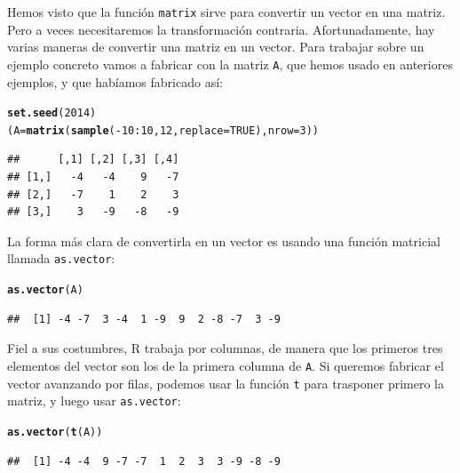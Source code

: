 \documentclass[10pt,a4paper]{article}\usepackage[]{graphicx}\usepackage[]{color}
\makeatletter
\newcommand{\hlnum}[1]{\textcolor[rgb]{0.686,0.059,0.569}{#1}}%
\newcommand{\hlopt}[1]{\textcolor[rgb]{0,0,0}{#1}}%
\newcommand{\hlstd}[1]{\textcolor[rgb]{0.345,0.345,0.345}{#1}}%
\newcommand{\hlkwb}[1]{\textcolor[rgb]{0.69,0.353,0.396}{#1}}%
\newcommand{\hlkwc}[1]{\textcolor[rgb]{0.333,0.667,0.333}{#1}}%
\newcommand{\hlkwd}[1]{\textcolor[rgb]{0.737,0.353,0.396}{\textbf{#1}}}%
\newenvironment{kframe}{%
 \def\at@end@of@kframe{}%
 \ifinner\ifhmode%
  \def\at@end@of@kframe{\end{minipage}}%
  \begin{minipage}{\columnwidth}%
 \fi\fi%
 \def\FrameCommand##1{\hskip\@totalleftmargin \hskip-\fboxsep
 \colorbox{shadecolor}{##1}\hskip-\fboxsep
     \hskip-\linewidth \hskip-\@totalleftmargin \hskip\columnwidth}%
 \MakeFramed {\advance\hsize-\width
   \@totalleftmargin\z@ \linewidth\hsize
   \@setminipage}}%
 {\par\unskip\endMakeFramed%
 \at@end@of@kframe}
\newenvironment{knitrout}{}{} %
\newcounter {cont01}
\makeatother
\begin{document}
Hemos visto que la función {\tt matrix} sirve para convertir un vector en una matriz. Pero a veces necesitaremos la transformación contraria. Afortunadamente, hay varias maneras de convertir una matriz en un vector. Para trabajar sobre un ejemplo concreto vamos a fabricar con la matriz {\tt A}, que hemos usado en anteriores ejemplos, y que habíamos fabricado así:
\begin{knitrout}
\color{fgcolor}\begin{kframe}
\begin{alltt}
\hlkwd{set.seed}\hlstd{(}\hlnum{2014}\hlstd{)}
\hlstd{(A} \hlkwb{=} \hlkwd{matrix}\hlstd{(}\hlkwd{sample}\hlstd{(}\hlopt{-}\hlnum{10}\hlopt{:}\hlnum{10}\hlstd{,} \hlnum{12}\hlstd{,} \hlkwc{replace}\hlstd{=}\hlnum{TRUE}\hlstd{),} \hlkwc{nrow}\hlstd{=}\hlnum{3}\hlstd{))}
\end{alltt}
\begin{verbatim}
##      [,1] [,2] [,3] [,4]
## [1,]   -4   -4    9   -7
## [2,]   -7    1    2    3
## [3,]    3   -9   -8   -9
\end{verbatim}
\end{kframe}
\end{knitrout}
     La forma más clara de convertirla en un vector es usando una función matricial llamada {\tt as.vector}:
\begin{knitrout}
\color{fgcolor}\begin{kframe}
\begin{alltt}
\hlkwd{as.vector}\hlstd{(A)}
\end{alltt}
\begin{verbatim}
##  [1] -4 -7  3 -4  1 -9  9  2 -8 -7  3 -9
\end{verbatim}
\end{kframe}
\end{knitrout}
     Fiel a sus costumbres, R trabaja por columnas, de manera que los primeros tres elementos del vector son los de la primera columna de {\tt A}. Si queremos fabricar el vector avanzando por filas, podemos usar la función {\tt t} para trasponer primero la matriz, y luego usar {\tt as.vector}:
\begin{knitrout}
\color{fgcolor}\begin{kframe}
\begin{alltt}
\hlkwd{as.vector}\hlstd{(}\hlkwd{t}\hlstd{(A))}
\end{alltt}
\begin{verbatim}
##  [1] -4 -4  9 -7 -7  1  2  3  3 -9 -8 -9
\end{verbatim}
\end{kframe}
\end{knitrout}
     
\end{document}
